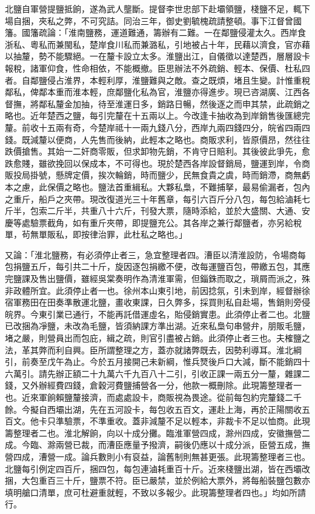 \begin{pinyinscope}
北鹽自軍營提鹽抵餉，遂為武人壟斷。提督李世忠部下赴壩領鹽，棧鹽不足，輒下場自捆，夾私之弊，不可究詰。同治三年，御史劉毓槐疏請整頓。事下江督曾國籓。國籓疏論：「淮南鹽務，運道難通，籌辦有二難。一在鄰鹽侵灌太久。西岸食浙私、粵私而兼閩私，楚岸食川私而兼潞私，引地被占十年，民藉以濟食，官亦藉以抽釐，勢不能驟絕。一在釐卡設立太多。淮鹽出江，自儀徵以達楚西，層層設卡報稅，諸軍仰食，性命相依，不能概撤。臣思辦法不外疏銷、輕本、保價、杜私四者。自鄰鹽侵占淮界，本輕利厚，淮鹽難與之敵。查之既煩，堵且生變。計惟重稅鄰私，俾鄰本重而淮本輕，庶鄰鹽化私為官，淮鹽亦得進步。現已咨湖廣、江西各督撫，將鄰私釐金加抽，待至淮運日多，銷路日暢，然後逐之而申其禁，此疏銷之略也。近年楚西之鹽，每引完釐在十五兩以上。今改逢卡抽收為到岸銷售後匯總完釐。前收十五兩有奇，今楚岸祗十一兩九錢八分，西岸九兩四錢四分，皖省四兩四錢。既減釐以便商，人先售而後納，此輕本之略也。商販求利，皆原價昂，然往往跌價搶售。其始一二奸商零販，但求卸物先銷，不肯守日賠利。其後彼此爭先，愈跌愈賤，雖欲挽回以保成本，不可得也。現於楚西各岸設督銷局，鹽運到岸，令商販投局掛號，懸牌定價，挨次輪銷，時而鹽少，民無食貴之虞，時而銷滯，商無虧本之慮，此保價之略也。鹽法首重緝私。大夥私梟，不難捕拏，最易偷漏者，包內之重斤，船戶之夾帶。現改復道光三十年舊章，每引六百斤分八包，每包給滷耗七斤半，包索二斤半，共重八十六斤，刊發大票，隨時添給，並於大盛關、大通、安慶等處驗票截角，如有重斤夾帶，即提鹽充公。其各岸之兼行鄰鹽者，亦另給稅單，茍無單販私，即按律治罪，此杜私之略也。」

又論：「淮北鹽務，有必須停止者三，急宜整理者四。漕臣以清淮設防，令場商每包捐鹽五斤，每引共二十斤，旋因逐包捐繳不便，改每運鹽百包，帶繳五包，其應完鹽課及售出鹽價，雖經吳棠奏明作為清淮軍需，但錙銖而取之，瑣屑而派之，殊非政體所宜。此須停止者一也。徐州本山東引地，前因捻氛，引未到岸，經督辦徐宿軍務田在田奏準散運北鹽，畫收東課，日久弊多，採買則私自赴場，售銷則旁侵皖界。今東引業已通行，不能再託借運虛名，貽侵銷實患。此須停止者二也。北鹽已改捆為凈鹽，未改為毛鹽，皆須納課方準出湖。近來私梟句串營弁，朋販毛鹽，堵之嚴，則營員出而包庇，緝之疏，則官引盡被占銷。此須停止者三也。夫榷鹽之法，革其弊而利自興。臣所謂整理之方，蓋亦就諸弊既去，因勢利導耳。淮北綱引，前奏至戊午為止。今於五月接開己未新綱，惟兵燹後戶口大減，斷不能銷四十六萬引。請先辦正額二十九萬六千九百八十二引，引收正課一兩五分一釐，雜課二錢，又外辦經費四錢，倉穀河費鹽捕營各一分，他款一概刪除。此現籌整理者一也。近來軍餉賴鹽釐接濟，而處處設卡，商販視為畏途。從前每包約完釐錢二千餘。今擬自西壩出湖，先在五河設卡，每包收五百文，運赴上海，再於正陽關收五百文。他卡只準驗票，不準重收。蓋非減釐不足以輕本，非裁卡不足以恤商。此現籌整理者二也。淮北解餉，向以十成分攤。臨淮軍營四成，滁州四成，安徽撫營二成。今臨、滁兩營已裁，而漕臣應量予撥濟，嗣後仍應以十成分派，臣營五成，撫營四成，漕營一成。論兵數則小有裒益，論舊制則無甚更張。此現籌整理者三也。北鹽每引例定四百斤，捆四包，每包連滷耗重百十斤。近來棧鹽出湖，皆在西壩改捆，大包重百三十斤，鹽票不符。臣已嚴禁，並於例給大票外，將每船裝鹽包數亦填明艙口清單，庶可杜避重就輕，不致以多報少。此現籌整理者四也。」均如所請行。


\end{pinyinscope}
